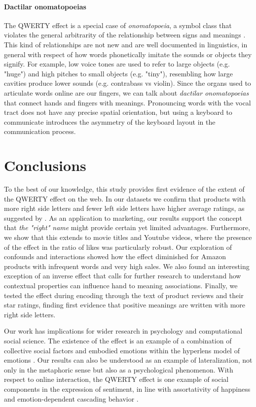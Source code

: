 \documentclass[letterpaper]{sig-alternate-2013}
\begin{document}
\paragraph{Dactilar onomatopoeias} The QWERTY effect is a special case of
\emph{onomatopoeia}, a symbol class that violates the general arbitrarity of
the relationship between signs and meanings \cite{DeSaussure1966}. This kind
of relationships are not new and are well documented in linguistics, in
general with respect of how words phonetically imitate the sounds or objects
they signify. For example, low voice tones are used to refer to large objects
(e.g. "huge") and high pitches to small objects (e.g. "tiny"), resembling how
large cavities produce lower sounds (e.g. contrabass vs violin). Since the
organs used to articulate words online are our fingers, we can talk about
\emph{dactilar onomatopoeias} that connect hands and fingers with meanings.
Pronouncing words with the vocal tract does not have any precise spatial
orientation, but using a keyboard to communicate introduces the asymmetry of
the keyboard layout in the communication process.


\section{Conclusions}

To the best of our knowledge, this study provides first evidence of the extent of the QWERTY effect on the web. In our
datasets we confirm that products with more right side letters and fewer left
side letters have higher average ratings, as suggested by \cite{Jasmin2012}.
As an application to marketing, our results support the concept that \emph{the
"right" name} might provide certain yet limited advantages. Furthermore, we
show that this extends to movie titles and Youtube videos, where the presence
of the effect in the ratio of likes was particularly robust. Our exploration
of confounds and interactions showed how the effect diminished for Amazon
products with infrequent words and very high sales. We also found an
interesting exception of an inverse effect that calls for further research to
understand how contextual properties can influence hand to meaning
associations. Finally, we tested the effect during encoding through the
text of product reviews and their star ratings, finding first evidence that positive meanings are written with more right side letters.

Our work has implications for wider research in psychology and computational social
science. The existence of the effect is an example of a combination of
collective social factors and embodied emotions within the hyperlens model of
emotions \cite{Kappas2013}. Our results can also be understood as an example
of lateralization, not only in the metaphoric sense but also as a
psychological phenomenon. With respect to online interaction, the QWERTY
effect is one example of social components in the expression of sentiment, in
line with assortativity of happiness \cite{Bollen2011} and emotion-dependent
cascading behavior \cite{Alvarez2015}. 
\end{document}
